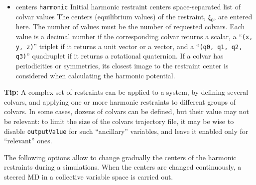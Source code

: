 \begin{itemize}
\item %
  \key
    {centers}{%
    \texttt{harmonic}}{%
    Initial harmonic restraint centers}{%
    space-separated list of colvar values}{%
    The centers (equilibrium values) of the restraint, $\xi_{0}$, are entered here.
    The number of values must be the number of requested colvars.
    Each value is a decimal number if the corresponding colvar returns
    a scalar, a ``\texttt{(x, y, z)}'' triplet if it returns a unit
    vector or a vector, and a ``\texttt{(q0, q1, q2, q3)}'' quadruplet
    if it returns a rotational quaternion.  If a colvar has
    periodicities or symmetries, its closest image to the restraint
    center is considered when calculating the harmonic potential.}
\end{itemize}

\textbf{Tip:} A complex set of restraints can be applied to a system,
by defining several colvars, and applying one or more harmonic
restraints to different groups of colvars.  In some cases, dozens of
colvars can be defined, but their value may not be relevant: to
limit the size of the colvars trajectory file, it
may be wise to disable \texttt{outputValue} for such ``ancillary''
variables, and leave it enabled only for ``relevant'' ones.



The following options allow to change gradually the centers of the harmonic restraints during a simulations.
When the centers are changed continuously, a steered MD in a collective variable space is carried out.

